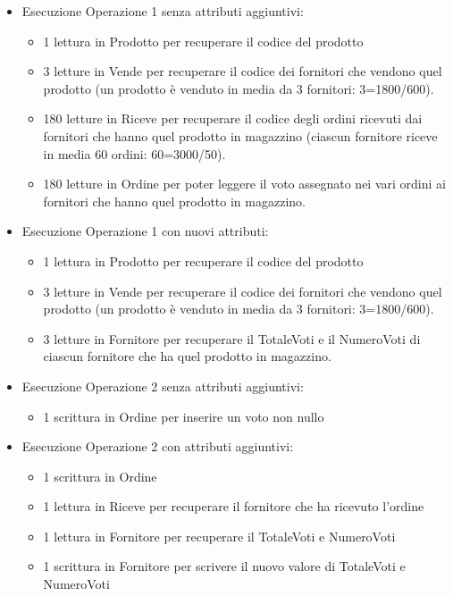 \begin{itemize}
	\item Esecuzione Operazione 1 senza attributi aggiuntivi:
	\begin{itemize}
		\item 1 lettura in Prodotto per recuperare il codice del prodotto
		\item 3 letture in Vende per recuperare il codice dei fornitori che vendono quel prodotto (un prodotto è venduto in media da 3 fornitori: 3=1800/600).
		\item 180 letture in Riceve per recuperare il codice degli ordini ricevuti dai fornitori che hanno quel prodotto
		in magazzino (ciascun fornitore riceve in media 60 ordini: 60=3000/50).
		\item 180 letture in Ordine per poter leggere il voto assegnato nei vari ordini ai fornitori che hanno quel prodotto in magazzino.
	\end{itemize}
	\item Esecuzione Operazione 1 con nuovi attributi:
	\begin{itemize}
		\item 1 lettura in Prodotto per recuperare il codice del
		prodotto
		\item 3 letture in Vende per recuperare il codice dei fornitori che vendono quel prodotto (un prodotto è venduto in media da 3 fornitori: 3=1800/600).
		\item 3 letture in Fornitore per recuperare il TotaleVoti e
		il NumeroVoti di ciascun fornitore che ha quel
		prodotto in magazzino.
	\end{itemize}
	\item Esecuzione Operazione 2 senza attributi aggiuntivi:
	\begin{itemize}
		\item 1 scrittura in Ordine per inserire un voto non nullo
	\end{itemize}
	\item Esecuzione Operazione 2 con attributi aggiuntivi:
	\begin{itemize}
		\item 1 scrittura in Ordine
		\item 1 lettura in Riceve per recuperare il fornitore che ha ricevuto l’ordine
		\item 1 lettura in Fornitore per recuperare il TotaleVoti e NumeroVoti
		\item 1 scrittura in Fornitore per scrivere il nuovo valore di TotaleVoti e NumeroVoti
	\end{itemize}
\end{itemize}
